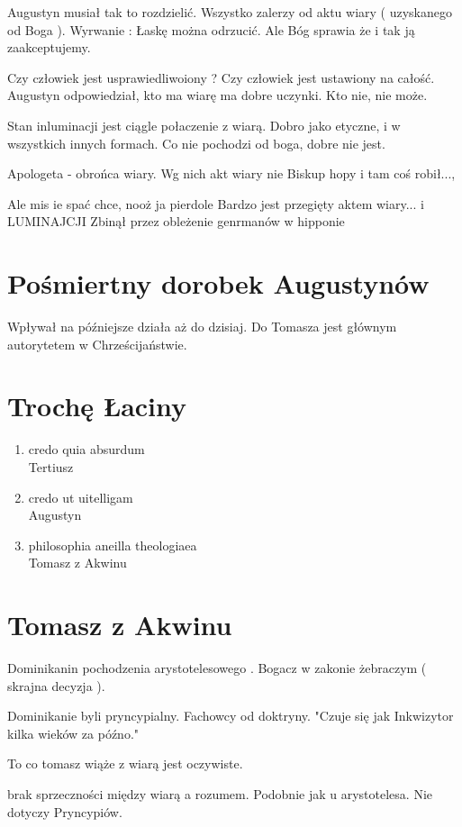 \documentclass[11pt]{article}
\begin{document}
Augustyn musiał tak to rozdzielić. Wszystko zalerzy od aktu wiary ( uzyskanego od Boga ). Wyrwanie : Łaskę można odrzucić. Ale Bóg sprawia że i tak ją zaakceptujemy.

Czy człowiek jest usprawiedliwoiony ? Czy człowiek jest ustawiony na całość. Augustyn odpowiedział, kto ma wiarę ma dobre uczynki. Kto nie, nie może.

Stan inluminacji jest ciągle połaczenie z wiarą. Dobro jako etyczne, i w wszystkich innych formach. Co nie pochodzi od boga, dobre nie jest.

Apologeta - obrońca wiary. Wg nich akt wiary nie 
Biskup hopy i tam coś robił...,


Ale mis ie spać chce, nooż ja pierdole
Bardzo jest przegięty aktem wiary...
i LUMINAJCJI 
Zbinął przez obleżenie genrmanów w hipponie

\section{Pośmiertny dorobek Augustynów}
Wpływał na późniejsze działa aż do dzisiaj.
Do Tomasza jest głównym autorytetem w Chrześcijaństwie. 

\section{Trochę Łaciny}
\begin{enumerate}
\item{credo quia absurdum} \\
Tertiusz
\item{credo ut uitelligam} \\
Augustyn
\item{philosophia aneilla theologiaea} \\
Tomasz z Akwinu
\end{enumerate}

\section{Tomasz z Akwinu}
Dominikanin pochodzenia arystotelesowego . Bogacz w zakonie żebraczym ( skrajna decyzja ).

Dominikanie byli pryncypialny. Fachowcy od doktryny. 
"Czuje się jak Inkwizytor kilka wieków za późno."

To co tomasz wiąże z wiarą jest oczywiste.

brak sprzeczności między wiarą a rozumem. Podobnie jak u arystotelesa. Nie dotyczy Pryncypiów. 
\end{document}

